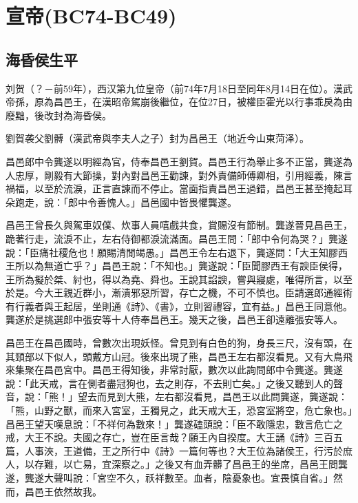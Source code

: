 
\section{宣帝\tiny(BC74-BC49)}

\subsection{海昏侯生平}

刘贺（？－前59年），西汉第九位皇帝（前74年7月18日至同年8月14日在位）。漢武帝孫，原為昌邑王，在漢昭帝駕崩後繼位，在位27日，被權臣霍光以行事乖戾為由廢黜，後改封為海昏侯。

劉賀袭父劉髆（漢武帝與李夫人之子）封为昌邑王（地近今山東菏泽）。

昌邑郎中令龔遂以明經為官，侍奉昌邑王劉賀。昌邑王行為舉止多不正當，龔遂為人忠厚，剛毅有大節操，對內對昌邑王勸諫，對外責備師傅卿相，引用經義，陳言禍福，以至於流淚，正言直諫而不停止。當面指責昌邑王過錯，昌邑王甚至掩起耳朵跑走，說：「郎中令善愧人。」昌邑國中皆畏懼龔遂。

昌邑王曾長久與駕車奴僕、炊事人員嘻戲共食，賞賜沒有節制。龔遂晉見昌邑王，跪著行走，流淚不止，左右侍御都淚流滿面。昌邑王問：「郎中令何為哭？」龔遂說：「臣痛社稷危也！願賜清閒竭愚。」昌邑王令左右退下，龔遂問：「大王知膠西王所以為無道亡乎？」昌邑王說：「不知也。」龔遂說：「臣聞膠西王有諛臣侯得，王所為擬於桀、紂也，得以為堯、舜也。王說其諂諛，嘗與寢處，唯得所言，以至於是。今大王親近群小，漸漬邪惡所習，存亡之機，不可不慎也。臣請選郎通經術有行義者與王起居，坐則通《詩》、《書》，立則習禮容，宜有益。」昌邑王同意他。龔遂於是挑選郎中張安等十人侍奉昌邑王。幾天之後，昌邑王卻遠離張安等人。

昌邑王在昌邑國時，曾數次出現妖怪。曾見到有白色的狗，身長三尺，沒有頭，在其頸部以下似人，頭戴方山冠。後來出現了熊，昌邑王左右都沒看見。又有大鳥飛來集聚在昌邑宮中。昌邑王得知後，非常討厭，數次以此詢問郎中令龔遂。龔遂說：「此天戒，言在側者盡冠狗也，去之則存，不去則亡矣。」之後又聽到人的聲音，說：「熊！」望去而見到大熊，左右都沒看見，昌邑王以此問龔遂，龔遂說：「熊，山野之獸，而來入宮室，王獨見之，此天戒大王，恐宮室將空，危亡象也。」昌邑王望天嘆息說：「不祥何為數來！」龔遂磕頭說：「臣不敢隱忠，數言危亡之戒，大王不說。夫國之存亡，豈在臣言哉？願王內自揆度。大王誦《詩》三百五篇，人事浹，王道備，王之所行中《詩》一篇何等也？大王位為諸侯王，行污於庶人，以存難，以亡易，宜深察之。」之後又有血弄髒了昌邑王的坐席，昌邑王問龔遂，龔遂大聲叫說：「宮空不久，祅祥數至。血者，陰憂象也。宜畏慎自省。」然而，昌邑王依然故我。

